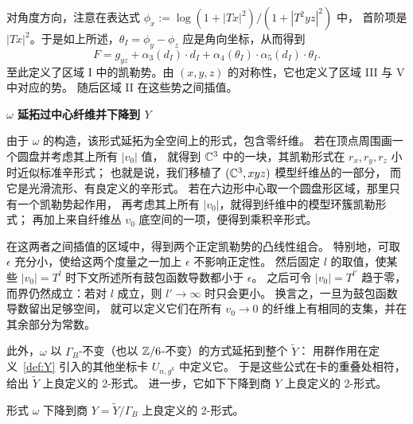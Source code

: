 对角度方向，注意在表达式 $\phi_x:=\log(1+|Tx|^2)/(1+|T^2yz|^2)$ 中，
首阶项是 $|Tx|^2$。于是如上所述，$\theta_I=\phi_y-\phi_z$ 应是角向坐标，从而得到
\[
F=g_{yz}+\alpha_3(d_I)\cdot d_I+\alpha_4(\theta_I)\cdot\alpha_5(d_I)\cdot\theta_I.
\]
至此定义了区域 I 中的凯勒势。由 $(x,y,z)$ 的对称性，它也定义了区域 III 与 V 中对应的势。
随后区域 II 在这些势之间插值。

\medskip\noindent\textbf{$\omega$ 延拓过中心纤维并下降到 $Y$}\par

由于 $\omega$ 的构造，该形式延拓为全空间上的形式，包含零纤维。
若在顶点周围画一个圆盘并考虑其上所有 $|v_0|$ 值，
就得到 $\mathbb{C}^3$ 中的一块，其凯勒形式在 $r_x,r_y,r_z$ 小时近似标准辛形式；
也就是说，我们移植了 $(\mathbb{C}^3,xyz)$ 模型纤维丛的一部分，
而它是光滑流形、有良定义的辛形式。
若在六边形中心取一个圆盘形区域，那里只有一个凯勒势起作用，
再考虑其上所有 $|v_0|$，就得到纤维中的模型环簇凯勒形式；
再加上来自纤维丛 $v_0$ 底空间的一项，便得到乘积辛形式。

在这两者之间插值的区域中，得到两个正定凯勒势的凸线性组合。
特别地，可取 $\epsilon$ 充分小，使给这两个度量之一加上 $\epsilon$ 不影响正定性。
然后固定 $l$ 的取值，使某些 $|v_0|=T^l$ 时下文所述所有鼓包函数导数都小于 $\epsilon$。
之后可令 $|v_0|=T^{l'}$ 趋于零，而界仍然成立：若对 $l$ 成立，则 $l'\to\infty$ 时只会更小。
换言之，一旦为鼓包函数导数留出足够空间，
就可以定义它们在所有 $v_0\to0$ 的纤维上有相同的支集，并在其余部分为常数。

此外，$\omega$ 以 $\Gamma_B$-不变（也以 $\mathbb{Z}/6$-不变）的方式延拓到整个 $\tilde Y$：
用群作用在定义~\ref{def:Y} 引入的其他坐标卡 $U_{n,g^k}$ 中定义它。
于是这些公式在卡的重叠处相符，给出 $\tilde Y$ 上良定义的 2-形式。
进一步，它如下下降到商 $Y$ 上良定义的 2-形式。

\begin{claim}\label{clm:descends}
形式 $\omega$ 下降到商 $Y=\tilde Y/\Gamma_B$ 上良定义的 2-形式。
\end{claim}

